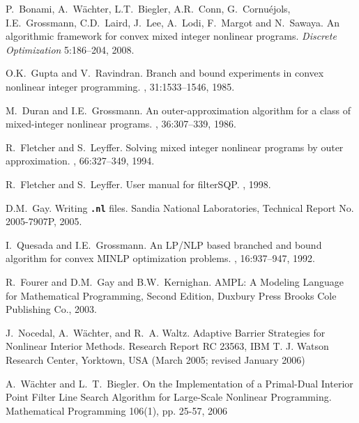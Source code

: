 \begin{PageSummary}
\end{PageSummary}
\begin{thebibliography}{10}


P.~Bonami, A.~W\"achter, L.T.~Biegler, A.R.~Conn, G.~Cornu\'ejols,
I.E.~Grossmann, C.D.~Laird, J.~Lee, A.~Lodi, F.~Margot and
N.~Sawaya.
\newblock An algorithmic framework for convex mixed integer nonlinear programs. {\em Discrete Optimization} 5:186--204, 2008.

O.K.~Gupta and V.~Ravindran.
\newblock Branch and bound experiments in convex nonlinear integer programming.
, 31:1533--1546, 1985.


M.~Duran and I.E.~Grossmann.
\newblock An outer-approximation algorithm for a class of mixed-integer nonlinear programs.
, 36:307--339, 1986.

R.~Fletcher and S.~Leyffer.
\newblock Solving mixed integer nonlinear programs by outer approximation.
, 66:327--349, 1994.

R.~Fletcher and S.~Leyffer.
\newblock User manual for filter{SQP}.
, 1998.

D.M.~Gay.
\newblock Writing \texttt{\bf .nl} files.
\newblock Sandia National Laboratories, Technical Report No. 2005-7907P, 2005.

I.~Quesada and I.E.~Grossmann.
\newblock An {LP/NLP} based branched and bound algorithm for convex {MINLP} optimization problems.
, 16:937--947, 1992.

R.~Fourer and D.M.~Gay and B.W.~Kernighan.
\newblock AMPL: A Modeling Language for Mathematical
Programming, Second Edition,
\newblock Duxbury Press Brooks Cole Publishing Co., 2003.


J.~Nocedal, A.~W\"achter, and R.~A. Waltz.
\newblock Adaptive Barrier Strategies for Nonlinear Interior Methods.
\newblock Research Report RC 23563, IBM T. J. Watson Research Center, Yorktown, USA (March 2005; revised January 2006)

A.~W\"achter and L.~T.~Biegler.
\newblock On the Implementation of a Primal-Dual Interior Point Filter Line Search Algorithm for Large-Scale Nonlinear Programming.
\newblock Mathematical Programming 106(1), pp. 25-57, 2006
\end{thebibliography}
